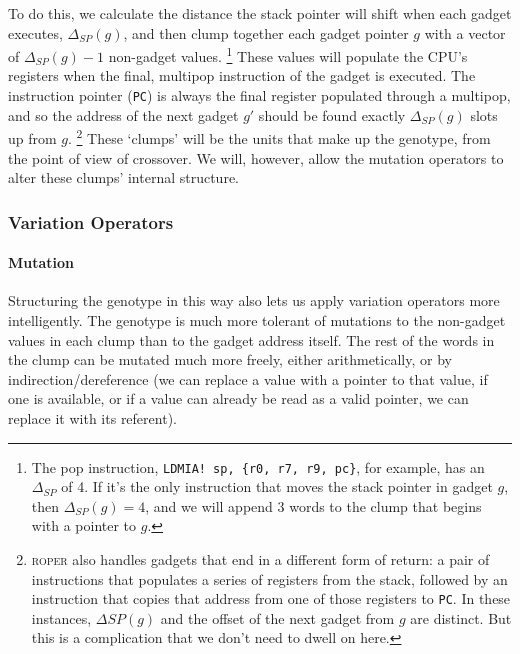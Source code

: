 To do this, we calculate the distance the stack pointer will shift
when each gadget executes, $\Delta_{SP}(g)$, and then clump
together each gadget pointer $g$ with a vector of
$\Delta_{SP}(g)-1$ non-gadget values.
\footnote{The pop instruction, \texttt{LDMIA! sp, \{r0, r7, 
  r9, pc\}},
  for example, has an $\Delta_{SP}$ of 4. If it's the only
  instruction that moves the stack pointer in gadget $g$, then
  $\Delta_{SP}(g) = 4$, and we will append 3 words to the clump
  that begins with a pointer to $g$.}
These values will populate
the CPU's registers when the final, multipop instruction of the
gadget is executed. The instruction pointer (\texttt{PC}) is always
the final register populated through a multipop, and so the
address of the next gadget $g'$ should be found exactly
$\Delta_{SP}(g)$ slots up from $g$.%
\footnote{\textsc{roper} also handles gadgets that end in a different
  form of return: a pair of instructions that populates a series
  of registers from the stack, followed by an instruction that
  copies that address from one of those registers to \texttt{PC}.
  In these instances, $\Delta{SP}(g)$ and the offset of the next
  gadget from $g$ are distinct. But this is a complication that
  we don't need to dwell on here.}
These `clumps' will be the units that make up the genotype,
from the point of view of crossover. We will,
however, allow the mutation operators to alter these clumps' internal structure. 


\subsubsection{Variation Operators}
\paragraph{Mutation}
Structuring the genotype in this way also
lets us apply variation operators more intelligently. The
genotype is much more tolerant of mutations to the non-gadget
values in each clump than to the gadget address itself.
The rest of the words in the
clump can be mutated much more freely, either arithmetically, or
by indirection/dereference (we can replace a value with a pointer
to that value, if one is available, or if a value can already be
read as a valid pointer, we can replace it with its referent).

